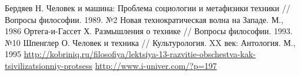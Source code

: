 \renewcommand{\refname}{Список используемой литературы}
\begin{thebibliography}{9}
     Бердяев Н. Человек и машина: Проблема социологии и 
        метафизики техники // Вопросы философии. 1989. №2 
     Новая технократическая волна на Западе. М., 1986
     Ортега-и-Гассет Х. Размышления о технике // 
        Вопросы философии. 1993. №10
     Шпенглер О. Человек и техника // Культурология. XX век:
        Антология. М., 1995
     \url{http://kobriniq.ru/filosofiya/lektsiya-13-razvitie-obschestva-kak-tsivilizatsionniy-protsess}
     \url{http://www.i-univer.com/?p=197}
\end{thebibliography}